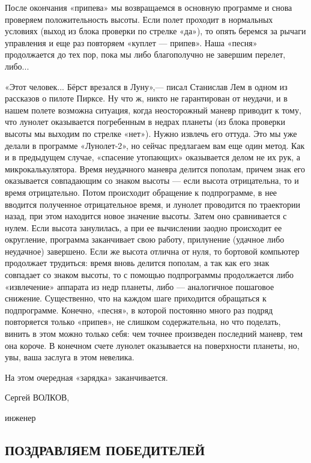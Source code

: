 \documentclass[11pt,a4paper,oneside]{article}
\begin{document}
После окончания «припева» мы возвращаемся в основную программе и снова проверяем положительность высоты. Если полет проходит в нормальных условиях (выход из блока проверки по стрелке «да»), то опять беремся за рычаги управления и еще раз повторяем «куплет — припев». Наша «песня» продолжается до тех пор, пока мы либо благополучно не завершим перелет, либо...

«Этот человек... Бёрст врезался в Луну»,— писал Станислав Лем в одном из рассказов о пилоте Пирксе. Ну что ж, никто не гарантирован от неудачи, и в нашем полете возможна ситуация, когда неосторожный маневр приводит к тому, что лунолет оказывается погребенным в недрах планеты (из блока проверки высоты мы выходим по стрелке «нет»). Нужно извлечь его оттуда. Это мы уже делали в программе «Лунолет-2», но сейчас предлагаем вам еще один метод. Как и в предыдущем случае, «спасение утопающих» оказывается делом не их рук, а микрокалькулятора. Время неудачного маневра делится пополам, причем знак его оказывается совпадающим со знаком высоты — если высота отрицательна, то и время отрицательно. Потом происходит обращение к подпрограмме, в нее вводится полученное отрицательное время, и лунолет проводится по траектории назад, при этом находится новое значение высоты. Затем оно сравнивается с нулем. Если высота занулилась, а при ее вычислении заодно происходит ее округление, программа заканчивает свою работу, прилунение (удачное либо неудачное) завершено. Если же высота отлична от нуля, то бортовой компьютер продолжает трудиться: время вновь делится пополам, а так как его знак совпадает со знаком высоты, то с помощью подпрограммы продолжается либо «извлечение» аппарата из недр планеты, либо — аналогичное пошаговое снижение. Существенно, что на каждом шаге приходится обращаться к подпрограмме. Конечно, «песня», в которой постоянно много раз подряд повторяется только «припев», не слишком содержательна, но что поделать, винить в этом можно только себя: чем точнее произведен последний маневр, тем она короче. В конечном счете лунолет оказывается на поверхности планеты, но, увы, ваша заслуга в этом невелика.

На этом очередная «зарядка» заканчивается.

Сергей ВОЛКОВ,

инженер


\subsection{ПОЗДРАВЛЯЕМ ПОБЕДИТЕЛЕЙ}
\end{document}
